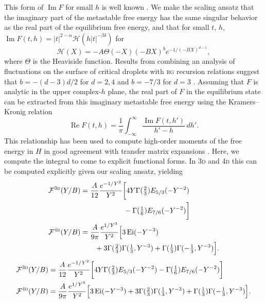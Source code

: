 \documentclass[aps,prl,reprint]{revtex4-1}
\def\[{\begin{equation}}
\def\]{\end{equation}}
\def\ei{\mathop{\mathrm{Ei}}\nolimits} %
\def\re{\mathop{\mathrm{Re}}\nolimits}
\def\im{\mathop{\mathrm{Im}}\nolimits}
\def\dd{d} %
\def\fF{\mathcal F}  %
\def\fiF{\mathcal H} %
\def\dim{d}
\def\threedee{\textsc{3d} }
\def\fourdee{\textsc{4d} }
\newif\ifreprint
\begin{document}
This form of $\im F$ for small $h$ is well known
\cite{langer.1967.condensation,harris.1984.metastability}.  We make the scaling
ansatz that the imaginary part of the metastable free energy has the same
singular behavior as the real part of the equilibrium free energy, and that for
small $t$, $h$, $\im F(t,h)=|t|^{2-\alpha}\fiF(h|t|^{-\beta\delta})$ for
\[
  \fiF(X)=-A\Theta(-X)(-BX)^be^{-1/(-BX)^{\dim-1}},
  \label{eq:im.scaling}
\]
where $\Theta$ is the Heaviside function. Results from combining an analysis
of fluctuations on the surface of critical droplets with \textsc{rg} recursion
relations suggest that $b=-(d-3)d/2$ for $d=2,4$ and $b=-7/3$ for
$d=3$
\cite{houghton.1980.metastable,rudnick.1976.equations,gunther.1980.goldstone}.
Assuming that $F$ is analytic in the upper complex-$h$ plane, the real part of
$F$ in the equilibrium state can be extracted from this imaginary metastable
free energy using the Kramers--Kronig relation
\[
  \re F(t,h)=\frac1\pi\int_{-\infty}^\infty\frac{\im F(t,h')}{h'-h}\,\dd h'.
\]
This relationship has been used to compute high-order moments of the free
energy in $H$ in good agreement with transfer matrix expansions
\cite{lowe.1980.instantons}. Here, we compute the integral to come to explicit
functional forms.  In \threedee and \fourdee this can be computed
explicitly given our scaling ansatz, yielding
\def\eqthreedeeone{
  \fF^\threedee(Y/B)&=
  \frac{A}{12}\frac{e^{-1/Y^2}}{Y^2}
  \bigg[4Y\Gamma(\tfrac23)E_{5/3}(-Y^{-2})
}
\def\eqthreedeetwo{
  -\Gamma(\tfrac16)E_{7/6}(-Y^{-2})\bigg]
}
\def\eqfourdeeone{
  \fF^\fourdee(Y/B)&=
  \frac{A}{9\pi}\frac{e^{1/Y^3}}{Y^2}
  \Big[3\ei(-Y^{-3})
}
\def\eqfourdeetwo{
  +3\Gamma(\tfrac23)\Gamma(\tfrac13,Y^{-3})
  +\Gamma(\tfrac13)\Gamma(-\tfrac13,Y^{-3})\Big]
}
\ifreprint
\begin{align}
  &\begin{aligned}
    \eqthreedeeone\\
    &\hspace{6em}
    \eqthreedeetwo
  \end{aligned}
  \\
  &\begin{aligned}
    \eqfourdeeone
    \\
    &\hspace{2em}
    \eqfourdeetwo.
  \end{aligned}
\end{align}
\else
\begin{align}
  \eqthreedeeone\eqthreedeetwo
  \\
  \eqfourdeeone\eqfourdeetwo.
\end{align}
\end{document}
